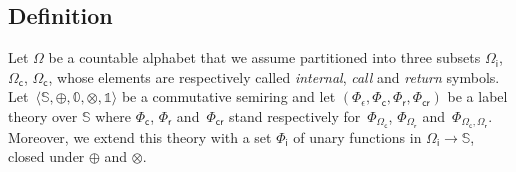 \documentclass[runningheads]{llncs}
\def\<#1>{\langle #1 \rangle}
\newcommand{\Semiring}{\mathbb{S}}
\newcommand{\zero}{\mathbb{0}}
\newcommand{\one}{\mathbb{1}}
\newcommand{\call}[1]{\ensuremath #1} %
\newcommand{\return}[1]{\ensuremath #1} %
\def\Omegai{{\Omega_\mathsf{i}}}
\def\Omegac{{\Omega_\mathsf{c}}}
\def\Omegar{{\Omega_\mathsf{r}}}
\def\Phii{{\Phi_\mathsf{i}}}
\def\Phic{{\Phi_\mathsf{c}}}
\def\Phir{{\Phi_\mathsf{r}}}
\def\Phicr{{\Phi_\mathsf{cr}}}
\begin{document}
\subsection{Definition}
Let $\Omega$ be a countable alphabet 
that we assume partitioned into three subsets 
$\Omegai$, $\Omegac$, $\Omegac$,
whose elements are respectively called 
\emph{internal}, \emph{call} and \emph{return} symbols.
Let~$\< \Semiring, \oplus, \zero, \otimes, \one>$ be a commutative semiring and  
let  $(\Phi_\epsilon, \Phic, \Phir, \Phicr)$ be a label theory over $\Semiring$
where $\Phic$, $\Phir$ and~$\Phicr$ stand respectively 
for~$\Phi_\Omegac$, $\Phi_\Omegar$ and~$\Phi_{\Omegac, \Omegar}$.
%
Moreover, we extend this theory with a set $\Phii$ 
of unary functions in $\Omegai \to \Semiring$,
closed under $\oplus$ and $\otimes$.
\end{document}
